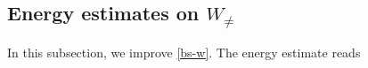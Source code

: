 \documentclass[12pt]{article}
\numberwithin{equation}{section}
\begin{document}
  	\subsection{Energy estimates on $W_{\neq}$}
  	In this subsection, we improve \eqref{bs-w}. The energy estimate reads
  	
\end{document}
